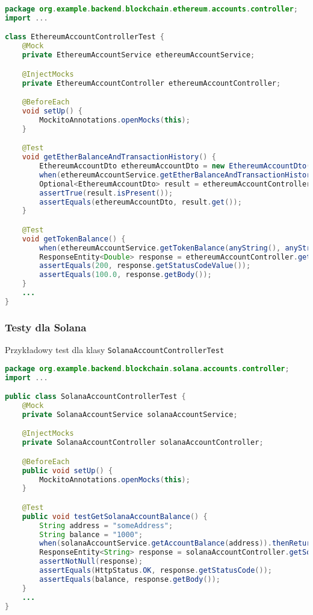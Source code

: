 \begin{lstlisting}[language=Java, style=JavaStyle]
package org.example.backend.blockchain.ethereum.accounts.controller;
import ...

class EthereumAccountControllerTest {
    @Mock
    private EthereumAccountService ethereumAccountService;

    @InjectMocks
    private EthereumAccountController ethereumAccountController;

    @BeforeEach
    void setUp() {
        MockitoAnnotations.openMocks(this);
    }

    @Test
    void getEtherBalanceAndTransactionHistory() {
        EthereumAccountDto ethereumAccountDto = new EthereumAccountDto();
        when(ethereumAccountService.getEtherBalanceAndTransactionHistory(anyString())).thenReturn(Optional.of(ethereumAccountDto));
        Optional<EthereumAccountDto> result = ethereumAccountController.GetEtherBalanceAndTransactionHistory("testAddress");
        assertTrue(result.isPresent());
        assertEquals(ethereumAccountDto, result.get());
    }

    @Test
    void getTokenBalance() {
        when(ethereumAccountService.getTokenBalance(anyString(), anyString())).thenReturn(100.0);
        ResponseEntity<Double> response = ethereumAccountController.getTokenBalance("testAddress", "testContractAddress");
        assertEquals(200, response.getStatusCodeValue());
        assertEquals(100.0, response.getBody());
    }
    ...
}
\end{lstlisting}

\subsubsection{Testy dla Solana}

Przykładowy test dla klasy \texttt{SolanaAccountControllerTest}

\begin{lstlisting}[language=Java, style=JavaStyle]
package org.example.backend.blockchain.solana.accounts.controller;
import ...

public class SolanaAccountControllerTest {
    @Mock
    private SolanaAccountService solanaAccountService;

    @InjectMocks
    private SolanaAccountController solanaAccountController;

    @BeforeEach
    public void setUp() {
        MockitoAnnotations.openMocks(this);
    }

    @Test
    public void testGetSolanaAccountBalance() {
        String address = "someAddress";
        String balance = "1000";
        when(solanaAccountService.getAccountBalance(address)).thenReturn(Optional.of(balance));
        ResponseEntity<String> response = solanaAccountController.getSolanaAccountBalance(address);
        assertNotNull(response);
        assertEquals(HttpStatus.OK, response.getStatusCode());
        assertEquals(balance, response.getBody());
    }
    ...
}
\end{lstlisting}

